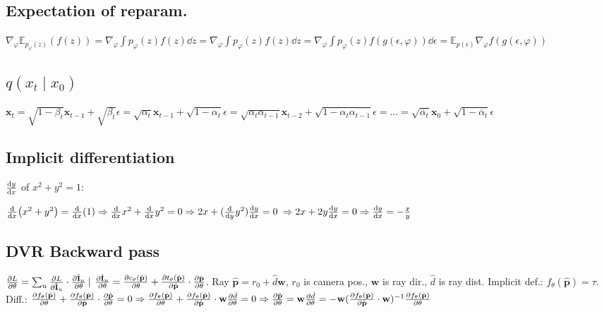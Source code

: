 \documentclass[11pt,landscape,a4paper,fleqn]{article}
\newcommand{\E}{\mathbb{E}}
\newcommand{\sep}{\,\textcolor{red}{\bm|}\,}
\def\myvector#1{\mathbf{#1}}
\def\vp{{\myvector{p}}}
\def\vw{{\myvector{w}}}
\def\vx{{\myvector{x}}}
\def\mymatrix#1{\mathbf{#1}}
\def\mI{{\mymatrix{I}}}
\begin{document}
\begin{multicols*}{4}
\subsection*{Expectation of reparam.}

\!\!$\nabla_\varphi \E_{p_\varphi(z)}(f(z)) = \nabla_\varphi \int p_\varphi(z) f(z) \dd z
= \nabla_\varphi\! \int\!\! p_\varphi(z) f(z) \dd z \!=\! \nabla_\varphi\! \int\!\! p_\varphi(z) f(g(\epsilon, \varphi)) \dd \epsilon
\!=\! \E_{p(\epsilon)}\! \nabla_\varphi f(g(\epsilon, \varphi))$

\subsection*{$q(x_t \mid x_0)$}
$\vx_t = \sqrt{1 - \beta_t} \vx_{t-1} + \sqrt{\beta_t} \epsilon
= \sqrt{\alpha_t} \vx_{t-1} + \sqrt{1 - \alpha_t} \epsilon
= \sqrt{\alpha_t \alpha_{t - 1}} \vx_{t-2} + \sqrt{1 - \alpha_t \alpha_{t - 1}} \epsilon
= \dots = \sqrt{\overline{\alpha}_t} \vx_0 + \sqrt{1 - \overline{\alpha}_t} \epsilon$


\subsection*{Implicit differentiation}

$\dv{y}{x}$ of $x^2 + y^2 = 1$:

$\dv{x}(x^2 + y^2) = \dv{x}(1) \Rightarrow \dv{x}x^2 + \dv{x}y^2 = 0 \Rightarrow 2x + (\dv{y} y^2) \dv{y}{x} = 0$
$\Rightarrow 2x + 2y \dv{y}{x} = 0 \Rightarrow \dv{y}{x} =- \frac{x}{y}$

\subsection*{DVR Backward pass}
$\pdv{L}{\theta} = \sum_u \pdv{L}{\hat\mI_u} \cdot \pdv{\hat\mI_u}{\theta} \sep\!$
$\pdv{\hat\mI_u}{\theta} = \pdv{c_\theta(\hat\vp)}{\theta} + \pdv{t_\theta(\hat\vp)}{\hat\vp}
 \cdot \pdv{\hat\vp}{\theta}$.
Ray $\hat\vp = r_0 + \hat{d}\vw$,
$r_0$ is camera pos., $\vw$ is ray dir., $\hat{d}$ is ray dist.
Implicit def.: $f_\theta(\hat\vp) = \tau$.
Diff.:
$\pdv{f_\theta(\hat\vp)}{\theta} + \pdv{f_\theta(\hat\vp)}{\hat\vp} \cdot \pdv{\hat\vp}{\theta} = 0 \Rightarrow
\pdv{f_\theta(\hat\vp)}{\theta} + \pdv{f_\theta(\hat\vp)}{\hat\vp} \cdot \vw\pdv{\hat{d}}{\theta} = 0 \Rightarrow 
\pdv{\hat\vp}{\theta} = \vw \pdv{\hat{d}}{\theta} = - \vw(\pdv{f_\theta(\hat{\vp})}{\hat{\vp}} \cdot \vw)^{-1}
\pdv{f_\theta(\hat\vp)}{\theta}$


\end{multicols*}
\end{document}
